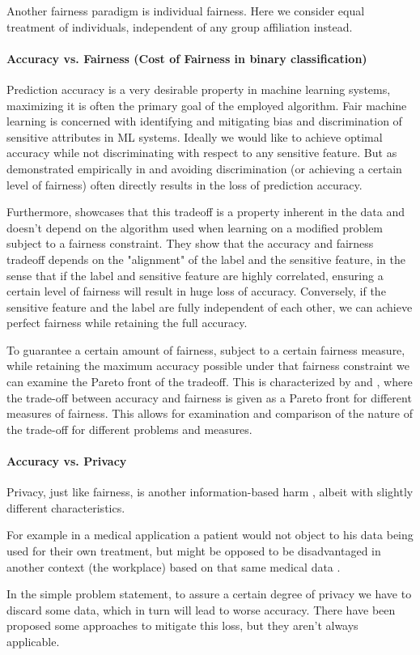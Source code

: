 	Another fairness paradigm is individual fairness.
	Here we consider equal treatment of individuals, independent of any group affiliation instead.

	\paragraph{Accuracy vs. Fairness (Cost of Fairness in binary classification)}
	Prediction accuracy is a very desirable property in machine learning systems, maximizing it is often the primary goal of the employed algorithm.
	Fair machine learning is concerned with identifying and mitigating bias and discrimination of sensitive attributes in ML systems.
	Ideally we would like to achieve optimal accuracy while not discriminating with respect to any sensitive feature.
	But as demonstrated empirically in \eg \cite{kamiran2010discrimination} and \cite{zliobaite2015relation} avoiding discrimination (or achieving a certain level of fairness) often directly results in the loss of prediction accuracy.

	Furthermore, \cite{menon2018cost} showcases that this tradeoff is a property inherent in the data and doesn't depend on the algorithm used when learning on a modified problem subject to a fairness constraint.
	They show that the accuracy and fairness tradeoff depends on the "alignment" of the label and the sensitive feature, in the sense that if the label and sensitive feature are highly correlated, ensuring a certain level of fairness will result in huge loss of accuracy.
	Conversely, if the sensitive feature and the label are fully independent of each other, we can achieve perfect fairness while retaining the full accuracy.

	To guarantee a certain amount of fairness, subject to a certain fairness measure, while retaining the maximum accuracy possible under that fairness constraint we can examine the Pareto front of the tradeoff. 	
	This is characterized by \cite{liu2020accuracy} and \cite{wei2020fairness}, where the trade-off between accuracy and fairness is given as a Pareto front for different measures of fairness.
	This allows for examination and comparison of the nature of the trade-off for different problems and measures.

	\paragraph{Accuracy vs. Privacy}
	Privacy, just like fairness, is another information-based harm \cite{van2008information}, albeit with slightly different characteristics.

	For example in a medical application a patient would not object to his data being used for their own treatment, but might be opposed to be disadvantaged in another context (\eg the workplace) based on that same medical data \cite{van2008information}.

	In the simple problem statement, to assure a certain degree of privacy we have to discard some data, which in turn will lead to worse accuracy.
	There have been proposed some approaches to mitigate this loss, but they aren't always applicable.
